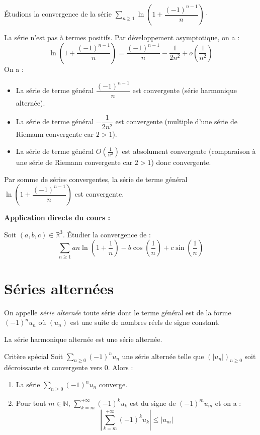\documentclass[french,11pt,twoside]{VcCours}
\newenvironment{ApplicationDirecte}{\textbf{Application directe du cours :}

}{}
\newcommand{\Sum}[2]{\ensuremath{\textstyle{\sum\limits_{#1}^{#2}}}}
\begin{document}
\begin{Exemple} Étudions la convergence de la série $\Sum{n\geq 1}{} \ln \left( 1 + \dfrac{(-1)^{n-1}}{n} \right) \cdot$

La série n'est pas à termes positifs. Par développement asymptotique, on a :
$$ \ln \left( 1 + \dfrac{(-1)^{n-1}}{n} \right) = \dfrac{(-1)^{n-1}}{n} - \frac{1}{2n^2} + o \left( \frac{1}{n^2} \right)$$ 
On a :
\begin{itemize}
\item La série de terme général $\dfrac{(-1)^{n-1}}{n}$ est convergente (série harmonique alternée).
\item La série de terme général $- \dfrac{1}{2n^2}$ est convergente (multiple d'une série de Riemann convergente car $2>1$).
\item La série de terme général $O \left( \frac{1}{n^2} \right)$ est absolument convergente (comparaison à une série de Riemann convergente car $2>1$) donc convergente.
\end{itemize}
Par somme de séries convergentes, la série de terme général $\ln \left( 1 + \dfrac{(-1)^{n-1}}{n} \right)$ est convergente.

\end{Exemple}

\begin{ApplicationDirecte} Soit $(a,b,c) \in \mathbb{R}^3$. Étudier la convergence de :
$$ \Sum{n \geq 1}{} a n \ln \left(1 + \frac{1}{n} \right) - b \cos \left( \frac{1}{n} \right) + c \sin \left( \frac{1}{n} \right)$$
\end{ApplicationDirecte}

\section{Séries alternées}

\begin{Definition}{} On appelle \emph{série alternée} toute série dont le terme général est de la forme $(-1)^n u_n$ où $(u_n)$ est une suite de nombres réels de signe constant.
\end{Definition}

\begin{Exemple} La série harmonique alternée est une série alternée.
\end{Exemple}

\begin{Theoreme}{Critère spécial}
Soit $\Sum{n \geq 0}{} (-1)^n u_n$ une série alternée telle que $(\vert u_n \vert)_{n \geq 0}$ soit décroissante et convergente vers $0$. Alors :
\begin{enumerate}
\item La série $\Sum{n \geq 0}{} (-1)^n u_n$ converge.
\item Pour tout $m \in \mathbb{N}$, $\Sum{k=m}{+ \infty} (-1)^k u_k$ est du signe de $(-1)^m u_m$ et on a :
$$ \left\vert \sum_{k=m}^{+ \infty} (-1)^k u_k \right\vert \leq \vert u_m \vert$$
\end{enumerate}
\end{Theoreme}
\end{document}
